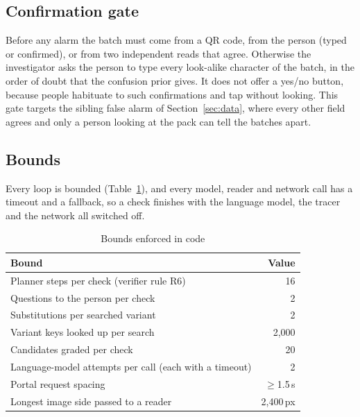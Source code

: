 \subsection{Confirmation gate}
Before any alarm the batch must come from a QR code, from the person (typed or confirmed), or from two independent reads that agree. Otherwise the investigator asks the person to type every look-alike character of the batch, in the order of doubt that the confusion prior gives. It does not offer a yes/no button, because people habituate to such confirmations and tap without looking. This gate targets the sibling false alarm of Section~\ref{sec:data}, where every other field agrees and only a person looking at the pack can tell the batches apart.

\subsection{Bounds}
Every loop is bounded (Table~\ref{tab:bounds}), and every model, reader and network call has a timeout and a fallback, so a check finishes with the language model, the tracer and the network all switched off.

\begin{table}[t]
\centering
\caption{Bounds enforced in code}
\label{tab:bounds}
\scriptsize
\begin{tabularx}{\columnwidth}{@{}X r@{}}
\toprule
Bound & Value \\
\midrule
Planner steps per check (verifier rule R6) & 16 \\
Questions to the person per check & 2 \\
Substitutions per searched variant & 2 \\
Variant keys looked up per search & 2{,}000 \\
Candidates graded per check & 20 \\
Language-model attempts per call (each with a timeout) & 2 \\
Portal request spacing & $\geq$1.5\,s \\
Longest image side passed to a reader & 2{,}400\,px \\
\bottomrule
\end{tabularx}
\end{table}
